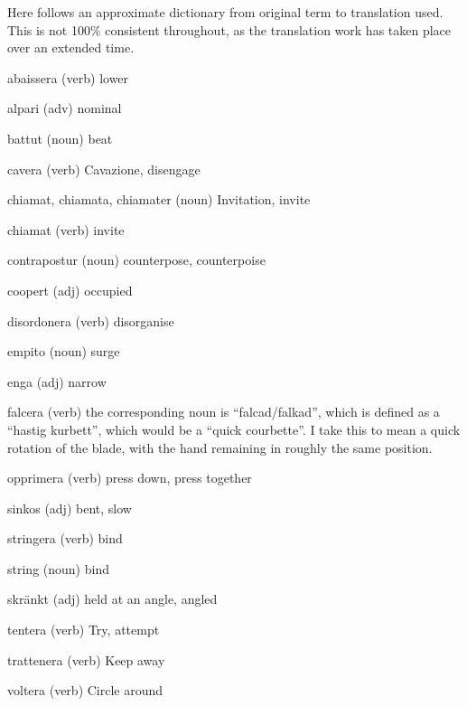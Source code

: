 \newpage
{}

Here follows an approximate dictionary from original term to translation used. This is not 100\% consistent throughout, as the translation work has taken place over an extended time.

\begin{description}
\item{abaissera} (verb) lower
\item{alpari} (adv) nominal
\item{battut} (noun) beat
\item{cavera} (verb) Cavazione, disengage
\item{chiamat, chiamata, chiamater} (noun) Invitation, invite
\item{chiamat} (verb) invite
\item{contrapostur} (noun) counterpose, counterpoise
\item{coopert} (adj) occupied
\item{disordonera} (verb) disorganise
\item{empito} (noun) surge
\item{enga} (adj) narrow
\item{falcera} (verb) the corresponding noun is ``falcad/falkad'', which is defined as a ``hastig kurbett'', which would be a ``quick courbette''. I take this to mean a quick rotation of the blade, with the hand remaining in roughly the same position.
\item{opprimera} (verb) press down, press together
\item{sinkos} (adj) bent, slow
\item{stringera} (verb) bind
\item{string} (noun) bind
\item{skränkt} (adj) held at an angle, angled
\item{tentera} (verb) Try, attempt
\item{trattenera} (verb) Keep away
\item{voltera} (verb) Circle around
\end{description}
